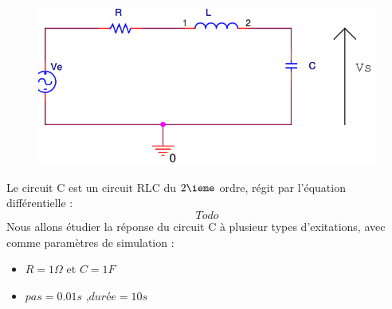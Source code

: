 \documentclass[a4paper,11pt]{article}
\begin{document}
  \begin{figure}[H]
	 \begin{center}
	\includegraphics[scale=.5]{circuitC}
	\end{center}
      \end{figure}
   Le circuit C est un circuit RLC du $2\ieme$ ordre, régit par l'équation différentielle :
   \begin{equation*}
    Todo
   \end{equation*}
  Nous allons étudier la réponse du circuit C à plusieur types d'exitations, avec comme paramètres de simulation :  \\
  \begin{itemize}
   \item $R = 1 \Omega$ et $C = 1 F$
     \item $pas = 0.01 s$ ,$durée = 10s$ 
  \end{itemize}
\end{document}
